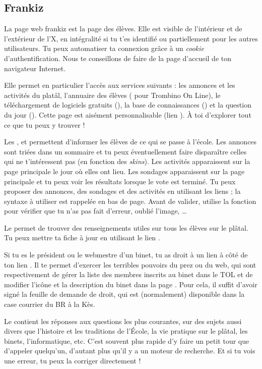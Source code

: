 \subsection{Frankiz}
\label{frankiz} La page web frankiz est la page des élèves. Elle est visible de l'intérieur et de
l'extérieur de l'X, en intégralité si tu t'es identifié ou partiellement pour les autres
utilisateurs. Tu peux automatiser ta connexion grâce à un \emph{cookie} d'authentification. Nous te
conseillons de faire de  la page d'accueil de ton navigateur Internet.

Elle permet en particulier l'accès aux services suivants : les
annonces et les activités du platâl, l'annuaire des élèves
( pour Trombino On Line), le téléchargement de logiciels
gratuits (), la base de connaissances () et
la question du jour (). Cette page est
aisément personnalisable (lien ). À toi d'explorer
tout ce que tu peux y trouver !

Les ,  et  permettent d'informer les élèves de ce qui se passe à l'école. Les annonces sont triées dans
un sommaire et tu peux éventuellement faire disparaître celles qui ne t'intéressent pas (en fonction des \emph{skins}). Les activités apparaissent
sur la page principale le jour où elles ont lieu. Les sondages apparaissent sur la page principale et tu peux voir les
résultats lorsque le vote est terminé. Tu peux proposer des annonces, des sondages et des activités en utilisant les liens ; la syntaxe à utiliser est
rappelée en bas de page. Avant de valider, utilise la fonction  pour vérifier que tu n'as pas fait d'erreur, oublié l'image, \dots

Le  permet de trouver des renseignements utiles sur
tous les élèves sur le plâtal. Tu peux mettre ta fiche à jour en
utilisant le lien .

Si tu es le président ou le webmestre d'un binet, tu as droit à un
lien  à c\^oté de ton lien .
Il te permet d'exercer les terribles pouvoirs du prez ou du web, qui
sont respectivement de gérer la liste des membres inscrits au binet
dans le TOL et de modifier l'ic\^one et la description du binet dans
la page . Pour cela, il suffit d'avoir signé la feuille
de demande de droit, qui est (normalement) disponible dans la case
courrier du BR à la Kès.

Le  contient les réponses aux questions les plus courantes, sur des sujets aussi divers que l'histoire et les traditions de l'\'Ecole, la
vie pratique sur le plâtal, les binets, l'informatique, etc. C'est souvent plus rapide d'y faire un petit tour que d'appeler quelqu'un, d'autant plus qu'il y a
un moteur de recherche. Et si tu vois une erreur, tu peux la corriger directement !

